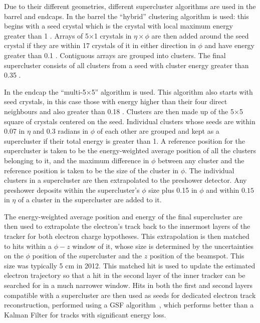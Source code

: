 Due to their different geometries, different supercluster algorithms are used in the barrel and endcaps. In the barrel the ``hybrid'' clustering algorithm is used: this begins with a seed crystal which is the crystal with local maximum energy greater than 1 \GeV. Arrays of 5$\times$1 crystals in $\eta\times\phi$ are then added around the seed crystal if they are within 17 crystals of it in either direction in $\phi$ and have energy greater than 0.1 \GeV. Contiguous arrays are grouped into clusters. The final supercluster consists of all clusters from a seed with cluster energy greater than 0.35 \GeV.

In the endcap the ``multi-5$\times$5'' algorithm is used. This algorithm also starts with seed crystals, in this case those with energy higher than their four direct neighbours and also greater than 0.18 \GeV. Clusters are then made up of the 5$\times$5 square of crystals centered on the seed. Individual clusters whose seeds are within 0.07 in $\eta$ and 0.3 radians in $\phi$ of each other are grouped and kept as a supercluster if their total energy is greater than 1\GeV. A reference position for the supercluster is taken to be the energy-weighted average position of all the clusters belonging to it, and the maximum difference in $\phi$ between any cluster and the reference position is taken to be the size of the cluster in $\phi$. The individual clusters in a supercluster are then extrapolated to the preshower detector. Any preshower deposits within the supercluster's $\phi$ size plus 0.15 in $\phi$ and within $0.15$ in $\eta$ of a cluster in the supercluster are added to it.

The energy-weighted average position and energy of the final supercluster are then used to extrapolate the electron's track back to the innermost layers of the tracker for both electron charge hypotheses. This extrapolation is then matched to hits within a $\phi - z$ window of it, whose size is determined by the uncertainties on the $\phi$ position of the supercluster and the $z$ position of the beamspot. This size was typically 5 cm in 2012. This matched hit is used to update the estimated electron trajectory so that a hit in the second layer of the inner tracker can be searched for in a much narrower window. Hits in both the first and second layers compatible with a supercluster are then used as seeds for dedicated electron track reconstruction, performed using a \ac{GSF} algorithm~\cite{GSFalgorithm}, which performs better than a Kalman Filter for tracks with significant energy loss.

